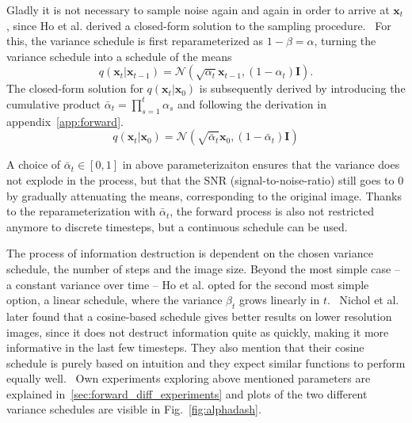 Gladly it is not necessary to sample noise again and again in order to arrive at $\bm{x}_t$, since Ho et al. derived a closed-form solution to the sampling procedure.~\autocite{ho2020denoising} For this, the variance schedule is first reparameterized as $1-\beta = \alpha$, turning the variance schedule into a schedule of the means
\begin{equation}
    q(\bm{x}_t | \bm{x}_{t-1}) = \mathcal{N}(\sqrt{\alpha_t} \bm{x}_{t-1}, (1-\alpha_t) \bm{I}).
    \label{eq:forward_alpha}
\end{equation}
The closed-form solution for $q(\bm{x}_t|\bm{x}_0)$ is subsequently derived by introducing the cumulative product $\bar{\alpha}_t = \prod_{s=1}^{t}\alpha_s$ and following the derivation in appendix~\ref{app:forward}.
\begin{equation}
    q(\bm{x}_t|\bm{x}_0) = \mathcal{N}(\sqrt{\bar{\alpha}_t}\bm{x}_0, (1-\bar{\alpha}_t)\bm{I})
    \label{eq:forward_alphadash}
\end{equation}

A choice of $\bar{\alpha}_t \in [0,1]$ in above parameterizaiton ensures that the variance does not explode in the process, but that the SNR (signal-to-noise-ratio) still goes to 0 by gradually attenuating the means, corresponding to the original image. Thanks to the reparameterization with $\bar{\alpha}_t$, the forward process is also not restricted anymore to discrete timesteps, but a continuous schedule can be used.~\autocite{kingma2023variational,song2021scorebased}

The process of information destruction is dependent on the chosen variance schedule, the number of steps and the image size. Beyond the most simple case -- a constant variance over time -- Ho et al. opted for the second most simple option, a linear schedule, where the variance $\beta_t$ grows linearly in $t$.~\autocite{ho2020denoising} Nichol et al. later found that a cosine-based schedule gives better results on lower resolution images, since it does not destruct information quite as quickly, making it more informative in the last few timesteps. They also mention that their cosine schedule is purely based on intuition and they expect similar functions to perform equally well.~\autocite{nichol2021improved}  Own experiments exploring above mentioned parameters are explained in~\ref{sec:forward_diff_experiments} and plots of the two different variance schedules are visible in Fig.~\ref{fig:alphadash}.

